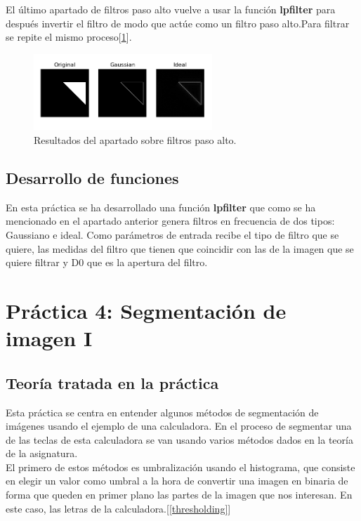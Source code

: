 \documentclass[a4paper,12pt]{report}
\begin{document}
El último apartado de filtros paso alto vuelve a usar la función \textbf{lpfilter} para después invertir el filtro de modo que actúe como un filtro paso alto.Para filtrar se repite el mismo proceso[\ref{fpa}].

\begin{figure}[h]
\centering
\includegraphics[width=0.6\textwidth]{imagenes/fpa}
\caption{Resultados del apartado sobre filtros paso alto.}
\label{fpa}
\end{figure}

\subsection{Desarrollo de funciones}

En esta práctica se ha desarrollado una función \textbf{lpfilter} que como se ha mencionado en el apartado anterior genera filtros en frecuencia de dos tipos: Gaussiano e ideal. Como parámetros de entrada recibe el tipo de filtro que se quiere, las medidas del filtro que tienen que coincidir con las de la imagen que se quiere filtrar y D0 que es la apertura del filtro.\\

\section{ Práctica 4: Segmentación de imagen I}
\subsection{Teoría tratada en la práctica}

Esta práctica se centra en entender algunos métodos de segmentación de imágenes usando el ejemplo de una calculadora. En el proceso de segmentar una de las teclas de esta calculadora se van usando varios métodos dados en la teoría de la asignatura.\\

El primero de estos métodos es umbralización usando el histograma, que consiste en elegir un valor como umbral a la hora de convertir una imagen en binaria de forma que queden en primer plano las partes de la imagen que nos interesan. En este caso, las letras de la calculadora.[\ref{thresholding}]\\
\end{document}
